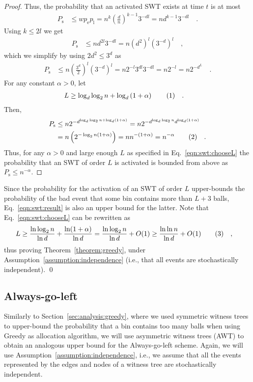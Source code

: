 \documentclass[a4paper,12pt]{article}
\newcommand\numberthis{\addtocounter{equation}{1}\tag{\theequation}}
\newcommand\neqn[1]{\numberthis\label{eqn:#1}}
\begin{document}
\begin{proof}
Thus, the probability that an activated SWT exists at time $t$ is at most 
\begin{align*}
P_\mathrm{s} &\leq w  p_\mathrm{e}  p_\mathrm{l} 
		= n^{k}  \left(\frac{d}{n}\right)^{k-1}  3^{-d  l} 
		= n  d^{k-1}  3^{-d  l}\quad .
\end{align*}
Using $k \leq 2l$ we get
\begin{align*}
P_\mathrm{s} &\leq n  d^{2 l}  3^{-d  l} 
		= n  \left(d^2\right)^l  \left( 3^{-d} \right)^l\quad ,
\end{align*}
which we simplify by using $2d^2 \leq 3^d$ as
\begin{align*}
P_\mathrm{s} &\leq n  \left(\frac{3^d}{2}\right)^l  \left( 3^{-d}\right)^l 
		= n  2^{-l}  3^{d l}  3^{-d  l} 
		= n 2^{-l}		
		= n 2^{-d^L} \quad .		
\end{align*}
For any constant $\alpha > 0 $, let
\begin{align*}
L &\geq \log_d\log_2 n + \log_d\left(1+\alpha\right) \neqn{swt:chooseL} \quad .
\end{align*}
Then, 
\begin{align*}
P_\mathrm{s} &\leq n  2^{{-d}^{\log_d\log_2 n + \log_d\left(1+\alpha\right)}} 
		= n  2^{-{d}^{\log_d\log_2 n} d^{\log_d \left(1+\alpha\right)}} \\
		&= n  \left( 2^{-\log_2 n  \left(1+ \alpha \right)} \right) 
		= n  n^{-\left(1+\alpha\right)} = n^{-\alpha} \neqn{swt:result}\quad .
\end{align*}
Thus, for any $\alpha>0$ and large enough $L$ as specified in Eq.~\ref{eqn:swt:chooseL} the probability that an SWT of order $L$ is activated is bounded from above as $P_\mathrm{s}\leq n^{-\alpha}$.
\end{proof}

Since the probability for the activation of an SWT of order $L$ upper-bounds the probability of the bad event that some bin contains more than $L+3$ balls, Eq.~\ref{eqn:swt:result} is also an upper bound for the latter. Note that Eq.~\ref{eqn:swt:chooseL} can be rewritten as
\begin{align*}
L &\geq  \frac{\ln\log_2 n}{\ln d} + \frac{\ln(1+\alpha)}{\ln d} 
   = \frac{\ln \log_2 n}{\ln d} +O(1) 
  \geq \frac{\ln \ln n}{\ln d} +O(1) \neqn{swt:boundL} \quad ,
\end{align*}
thus proving Theorem~\ref{theorem:greedy}, under Assumption~\ref{assumption:independence} (i.e., that all events are stochastically independent). \qed

\subsection{Always-go-left}
\label{sec:analysis:alg}
Similarly to Section~\ref{sec:analysis:greedy}, where we used symmetric witness trees to upper-bound the probability that a bin contains too many balls when using Greedy as allocation algorithm, we will use asymmetric witness trees (AWT) to obtain an analogous upper bound for the Always-go-left scheme. Again, we will use Assumption~\ref{assumption:independence}, i.e., we assume that all the events represented by the edges and nodes of a witness tree are stochastically independent.
\end{document}
